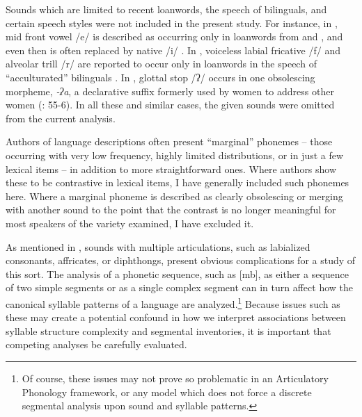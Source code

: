   Sounds which are limited to recent loanwords, the speech of bilinguals, and certain speech styles were not included in the present study. For instance, in , mid front vowel /e/ is described as occurring only in loanwords from  and , and even then is often replaced by native /i/ \citep[26]{Crawford1966}. In , voiceless labial fricative /f/ and alveolar trill /r/ are reported to occur only in loanwords in the speech of ``acculturated''  bilinguals \citep[13]{Kaufman1971}. In , glottal stop /ʔ/ occurs in one obsolescing morpheme, \textit{-ʔa}, a declarative suffix formerly used by women to address other women (\citealt{Cerrón-Palomino2006}: 55-6). In all these and similar cases, the given sounds were omitted from the current analysis.

  Authors of language descriptions often present ``marginal'' phonemes -- those occurring with very low frequency, highly limited distributions, or in just a few lexical items -- in addition to more straightforward ones. Where authors show these to be contrastive in lexical items, I have generally included such phonemes here. Where a marginal phoneme is described as clearly obsolescing or merging with another sound to the point that the contrast is no longer meaningful for most speakers of the variety examined, I have excluded it.

  As mentioned in , sounds with multiple articulations, such as labialized consonants, affricates, or diphthongs, present obvious complications for a study of this sort. The analysis of a phonetic sequence, such as [mb], as either a sequence of two simple segments or as a single complex segment can in turn affect how the canonical syllable patterns of a language are analyzed.\footnote{{Of course, these issues may not prove so problematic in an Articulatory Phonology framework, or any model which does not force a discrete segmental analysis upon sound and syllable patterns.}} Because issues such as these may create a potential confound in how we interpret associations between syllable structure complexity and segmental inventories, it is important that competing analyses be carefully evaluated. 

